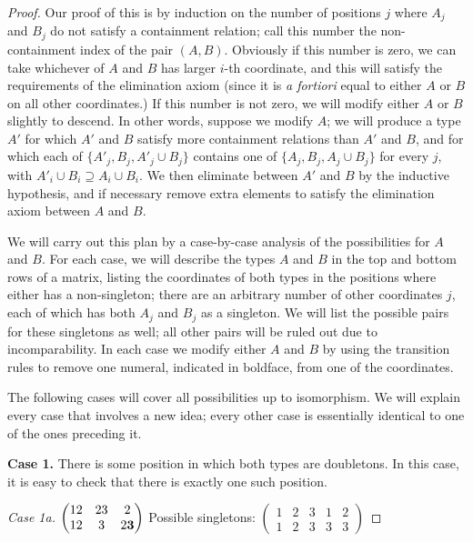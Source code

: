 \documentclass[11pt]{amsart}
\begin{document}
\begin{proof}
Our proof of this is by induction on the number of positions $j$ where $A_j$ and $B_j$ do not satisfy a containment relation; call this number the 
non-containment index of the pair $(A, B)$. Obviously if this 
number is zero, we can take whichever of $A$ and $B$ has larger $i$-th coordinate, and this will satisfy the requirements of the elimination axiom 
(since it is \textit{a fortiori} equal to either $A$ or $B$ on all other coordinates.) If this number is not zero, we will modify either $A$ or $B$ 
slightly to descend. In other words, suppose we modify $A$; we will produce a type $A'$ for which $A'$ and $B$ satisfy more containment relations than 
$A'$ and $B$, and for which each of $\{A'_j, B_j, A'_j\cup B_j\}$ contains one of $\{A_j, B_j, A_j\cup B_j\}$ for every $j$, with $A'_i\cup B_i 
\supseteq A_i\cup B_i$. We then eliminate between $A'$ and $B$ by the inductive hypothesis, and if necessary remove extra elements %
to satisfy the elimination axiom between $A$ and $B$.

We will carry out this plan by a case-by-case analysis of the possibilities for $A$ and $B$.
For each case, we will describe the types $A$ and $B$ in the top and bottom rows of a matrix, listing the coordinates of both 
types in the positions where either has a non-singleton; there are an arbitrary number of other coordinates $j$, each of which has both $A_j$ and $B_j$ 
as a singleton. We will list the possible pairs for these singletons as well; all other pairs will be ruled out due to incomparability. 
In each case we modify either $A$ and $B$ by using the transition rules to remove one numeral, indicated in boldface, from one of the coordinates. %

The following cases will cover all possibilities up to isomorphism. We will explain every case that involves a new idea; every other case is essentially identical to one of the ones preceding it.


\textbf{Case 1.} There is some position in which both types are doubletons. In this case, it is easy to check that there is exactly one such position.

\textit{Case 1a.} 
$\begin{pmatrix}
12 & 23 & 2 \\
12 & 3 & 2{\bf 3} 
\end{pmatrix}$
Possible singletons: 
$\begin{pmatrix}
1 & 2 & 3 & 1 & 2 \\
1 & 2 & 3 & 3 & 3
\end{pmatrix}$


\end{proof}
\end{document}
